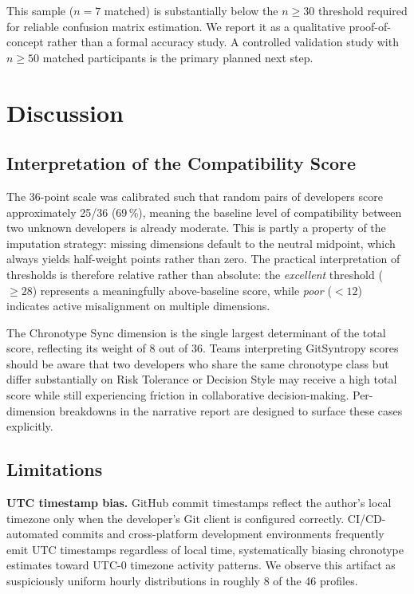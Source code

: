 \documentclass[conference]{IEEEtran}
\begin{document}
This sample ($n{=}7$ matched) is substantially below the $n \geq 30$
threshold required for reliable confusion matrix estimation.  We
report it as a qualitative proof-of-concept rather than a formal
accuracy study.  A controlled validation study with $n \geq 50$
matched participants is the primary planned next step.

\section{Discussion}
\label{sec:discuss}

\subsection{Interpretation of the Compatibility Score}

The 36-point scale was calibrated such that random pairs of
developers score approximately 25/36 (69\,\%), meaning the baseline
level of compatibility between two unknown developers is already
moderate.  This is partly a property of the imputation strategy:
missing dimensions default to the neutral midpoint, which always
yields half-weight points rather than zero.  The practical
interpretation of thresholds is therefore relative rather than
absolute: the \textit{excellent} threshold ($\geq 28$) represents
a meaningfully above-baseline score, while \textit{poor} ($< 12$)
indicates active misalignment on multiple dimensions.

The Chronotype Sync dimension is the single largest determinant of
the total score, reflecting its weight of 8 out of 36.  Teams
interpreting GitSyntropy scores should be aware that two developers
who share the same chronotype class but differ substantially on
Risk Tolerance or Decision Style may receive a high total score
while still experiencing friction in collaborative decision-making.
Per-dimension breakdowns in the narrative report are designed to
surface these cases explicitly.

\subsection{Limitations}

\textbf{UTC timestamp bias.}  GitHub commit timestamps reflect the
author's local timezone only when the developer's Git client is
configured correctly.  CI/CD-automated commits and cross-platform
development environments frequently emit UTC timestamps regardless
of local time, systematically biasing chronotype estimates toward
UTC-0 timezone activity patterns.  We observe this artifact as
suspiciously uniform hourly distributions in roughly 8 of the
46 profiles.
\end{document}
